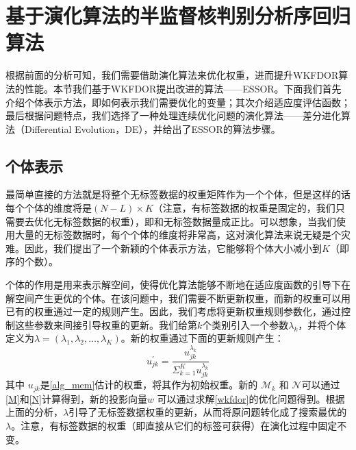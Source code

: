 \section{基于演化算法的半监督核判别分析序回归算法}
根据前面的分析可知，我们需要借助演化算法来优化权重，进而提升WKFDOR算法的性能。本节我们基于WKFDOR提出改进的算法——ESSOR。下面我们首先介绍个体表示方法，即如何表示我们需要优化的变量；其次介绍适应度评估函数；最后根据问题特点，我们选择了一种处理连续优化问题的演化算法——差分进化算法（Differential Evolution，DE），并给出了ESSOR的算法步骤。

\subsection{个体表示}
最简单直接的方法就是将整个无标签数据的权重矩阵作为一个个体，但是这样的话每个个体的维度将是\((N-L)\times K\)（注意，有标签数据的权重是固定的，我们只需要去优化无标签数据的权重），即和无标签数据量成正比。可以想象，当我们使用大量的无标签数据时，每个个体的维度将非常高，这对演化算法来说无疑是个灾难。因此，我们提出了一个新颖的个体表示方法，它能够将个体大小减小到\(K\)（即序的个数）。

个体的作用是用来表示解空间，使得优化算法能够不断地在适应度函数的引导下在解空间产生更优的个体。在该问题中，我们需要不断更新权重，而新的权重可以用已有的权重通过一定的规则产生。因此，我们考虑将更新权重规则参数化，通过控制这些参数来间接引导权重的更新。我们给第\(k\)个类别引入一个参数\(\lambda_{k}\)，并将个体定义为\(\lambda=(\lambda_{1},\lambda_{2},\dots,\lambda_{K})\)。新的权重通过下面的更新规则产生：
\begin{equation}
\label{mem_updateRule}
u_{jk}^{'}=\frac{u_{jk}^{\lambda_{k}}}{\Sigma_{k=1}^{K} u_{jk}^{\lambda_{k}}}
\end{equation}
其中 \(u_{jk}\)是\autoref{alg_mem}估计的权重，将其作为初始权重。新的 \(\mathcal{M}_{k}\) 和 \(\mathcal{N}\)可以通过\autoref{M}和\autoref{N}计算得到，新的投影向量\(w\) 可以通过求解\autoref{wkfdor}的优化问题得到。根据上面的分析，\(\lambda\)引导了无标签数据权重的更新，从而将原问题转化成了搜索最优的\(\lambda\)。注意，有标签数据的权重（即直接从它们的标签可获得）在演化过程中固定不变。

